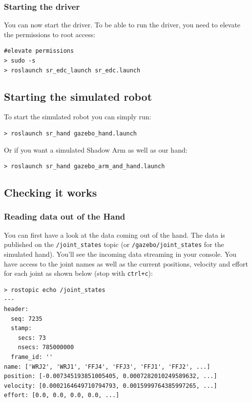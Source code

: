 \documentclass[12pt]{article}
\begin{document}
\subsubsection{Starting the driver}
\par You can now start the driver. To be able to run the driver, you need to elevate the permissions to root access:
  \begin{lstlisting}[escapeinside='']
#elevate permissions
> sudo -s
> roslaunch sr_edc_launch sr_edc.launch
  \end{lstlisting}

\subsection{Starting the simulated robot}
\label{sec:start-simul-hand}
\par To start the simulated robot you can simply run:
  \begin{lstlisting}[escapeinside='']
> roslaunch sr_hand gazebo_hand.launch
  \end{lstlisting}

\par Or if you want a simulated Shadow Arm as well as our hand:
  \begin{lstlisting}[escapeinside='']
> roslaunch sr_hand gazebo_arm_and_hand.launch
  \end{lstlisting}

\subsection{Checking it works}
\label{sec:checking-it-works}

\subsubsection{Reading data out of the Hand}
\par You can first have a look at the data coming out of the hand. The data is published on the \texttt{/joint\_states} topic (or \texttt{/gazebo/joint\_states} for the simulated hand). You'll see the incoming data streaming in your console. You have access to the joint names as well as the current positions, velocity and effort for each joint as shown below (stop with \texttt{ctrl+c}):
  \begin{lstlisting}[escapeinside='']
> rostopic echo /joint_states
---
header:
  seq: 7235
  stamp:
    secs: 73
    nsecs: 785000000
  frame_id: ''
name: ['WRJ2', 'WRJ1', 'FFJ4', 'FFJ3', 'FFJ1', 'FFJ2', ...]
position: [-0.007345193851005405, 0.0007282010249589632, ...]
velocity: [0.0002164649710794793, 0.0015999764385997265, ...]
effort: [0.0, 0.0, 0.0, 0.0, ...]
  \end{lstlisting}
\end{document}
